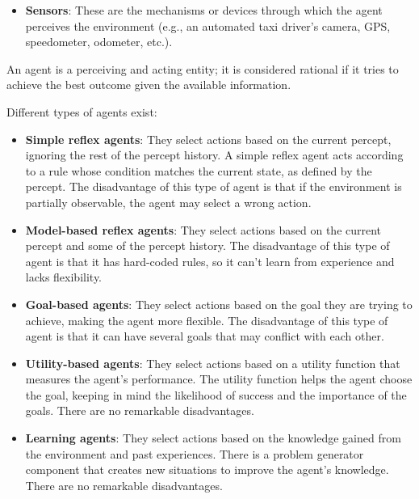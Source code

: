 \documentclass[12pt]{article}
\begin{document}
\begin{enumerate}[label=\textbf{A.\arabic*}]
\begin{itemize}
              \item \textbf{Sensors}: These are the mechanisms or devices through which the agent perceives the environment (e.g., an automated taxi driver's camera, GPS, speedometer, odometer, etc.).
          \end{itemize}

          An agent is a perceiving and acting entity; it is considered rational if it tries to achieve the best outcome given the available information.

          Different types of agents exist:

          \begin{itemize}
              \item \textbf{Simple reflex agents}: They select actions based on the current percept, ignoring the rest of the percept history. A simple reflex agent acts according to a rule whose condition matches the current state, as defined by the percept. The disadvantage of this type of agent is that if the environment is partially observable, the agent may select a wrong action.

              \item \textbf{Model-based reflex agents}: They select actions based on the current percept and some of the percept history. The disadvantage of this type of agent is that it has hard-coded rules, so it can't learn from experience and lacks flexibility.

              \item \textbf{Goal-based agents}: They select actions based on the goal they are trying to achieve, making the agent more flexible. The disadvantage of this type of agent is that it can have several goals that may conflict with each other.

              \item \textbf{Utility-based agents}: They select actions based on a utility function that measures the agent's performance. The utility function helps the agent choose the goal, keeping in mind the likelihood of success and the importance of the goals. There are no remarkable disadvantages.

              \item \textbf{Learning agents}: They select actions based on the knowledge gained from the environment and past experiences. There is a problem generator component that creates new situations to improve the agent's knowledge. There are no remarkable disadvantages.
          \end{itemize}
\end{enumerate}
\end{document}
